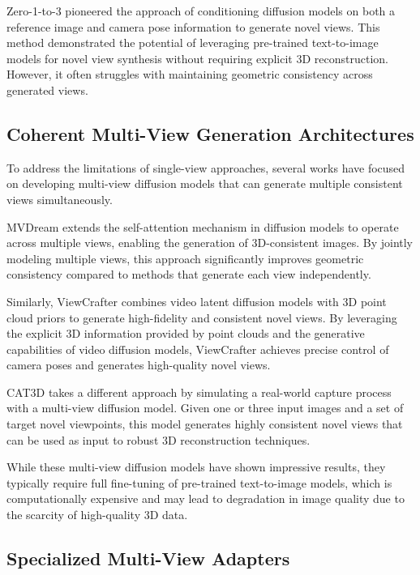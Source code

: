 Zero-1-to-3 \cite{zero1to3} pioneered the approach of conditioning
diffusion models on both a reference image and camera pose
information to generate novel views. This method demonstrated the
potential of leveraging pre-trained text-to-image models for novel
view synthesis without requiring explicit 3D reconstruction. However,
it often struggles with maintaining geometric consistency across
generated views.

\subsection{Coherent Multi-View Generation Architectures}

To address the limitations of single-view approaches, several works
have focused on developing multi-view diffusion models that can
generate multiple consistent views simultaneously.

MVDream \cite{mvdream} extends the self-attention mechanism in
diffusion models to operate across multiple views, enabling the
generation of 3D-consistent images. By jointly modeling multiple
views, this approach significantly improves geometric consistency
compared to methods that generate each view independently.

Similarly, ViewCrafter \cite{viewcrafter} combines video latent
diffusion models \cite{videolatentdiffusion} with 3D point cloud
priors to generate high-fidelity and consistent novel views. By
leveraging the explicit 3D information provided by point clouds and
the generative capabilities of video diffusion models, ViewCrafter
achieves precise control of camera poses and generates high-quality novel views.

CAT3D \cite{cat3d} takes a different approach by simulating a
real-world capture process with a multi-view diffusion model. Given
one or three input images and a set of target novel viewpoints, this
model generates highly consistent novel views that can be used as
input to robust 3D reconstruction techniques.

While these multi-view diffusion models have shown impressive
results, they typically require full fine-tuning of pre-trained
text-to-image models, which is computationally expensive and may lead
to degradation in image quality due to the scarcity of high-quality 3D data.

\subsection{Specialized Multi-View Adapters}

